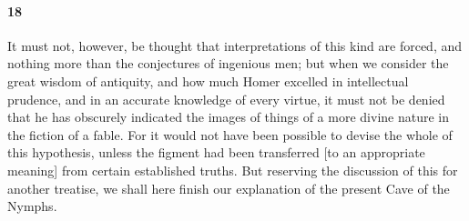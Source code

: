 \documentclass[12pt]{article}
\begin{document}
\paragraph{18} It must not, however, be thought that interpretations of this
kind are forced, and nothing more than the conjectures of ingenious men; but
when we consider the great wisdom of antiquity, and how much Homer excelled in
intellectual prudence, and in an accurate knowledge of every virtue, it must
not be denied that he has obscurely indicated the images of things of a more
divine nature in the fiction of a fable. For it would not have been possible to
devise the whole of this hypothesis, unless the figment had been transferred
[to an appropriate meaning] from certain established truths. But reserving the
discussion of this for another treatise, we shall here finish our explanation
of the present Cave of the Nymphs.
\end{document}
